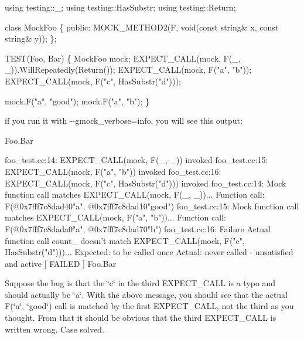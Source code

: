 \begin{DoxyCode}
\textcolor{keyword}{using} testing::\_;
\textcolor{keyword}{using} testing::HasSubstr;
\textcolor{keyword}{using} testing::Return;

\textcolor{keyword}{class }MockFoo \{
 \textcolor{keyword}{public}:
  MOCK\_METHOD2(F, \textcolor{keywordtype}{void}(\textcolor{keyword}{const} \textcolor{keywordtype}{string}& x, \textcolor{keyword}{const} \textcolor{keywordtype}{string}& y));
\};

TEST(Foo, Bar) \{
  MockFoo mock;
  EXPECT\_CALL(mock, F(\_, \_)).WillRepeatedly(Return());
  EXPECT\_CALL(mock, F(\textcolor{stringliteral}{"a"}, \textcolor{stringliteral}{"b"}));
  EXPECT\_CALL(mock, F(\textcolor{stringliteral}{"c"}, HasSubstr(\textcolor{stringliteral}{"d"})));

  mock.F(\textcolor{stringliteral}{"a"}, \textcolor{stringliteral}{"good"});
  mock.F(\textcolor{stringliteral}{"a"}, \textcolor{stringliteral}{"b"});
\}
\end{DoxyCode}


if you run it with {\ttfamily -\/-\/gmock\+\_\+verbose=info}, you will see this output\+:


\begin{DoxyCode}
[ RUN      ] Foo.Bar

foo\_test.cc:14: EXPECT\_CALL(mock, F(\_, \_)) invoked
foo\_test.cc:15: EXPECT\_CALL(mock, F("a", "b")) invoked
foo\_test.cc:16: EXPECT\_CALL(mock, F("c", HasSubstr("d"))) invoked
foo\_test.cc:14: Mock function call matches EXPECT\_CALL(mock, F(\_, \_))...
    Function call: F(@0x7fff7c8dad40"a", @0x7fff7c8dad10"good")
foo\_test.cc:15: Mock function call matches EXPECT\_CALL(mock, F("a", "b"))...
    Function call: F(@0x7fff7c8dada0"a", @0x7fff7c8dad70"b")
foo\_test.cc:16: Failure
Actual function call count_ doesn't match EXPECT\_CALL(mock, F("c", HasSubstr("d")))...
         Expected: to be called once
           Actual: never called - unsatisfied and active
[  FAILED  ] Foo.Bar
\end{DoxyCode}


Suppose the bug is that the {\ttfamily \char`\"{}c\char`\"{}} in the third {\ttfamily E\+X\+P\+E\+C\+T\+\_\+\+C\+A\+LL} is a typo and should actually be {\ttfamily \char`\"{}a\char`\"{}}. With the above message, you should see that the actual {\ttfamily F(\char`\"{}a\char`\"{}, \char`\"{}good\char`\"{})} call is matched by the first {\ttfamily E\+X\+P\+E\+C\+T\+\_\+\+C\+A\+LL}, not the third as you thought. From that it should be obvious that the third {\ttfamily E\+X\+P\+E\+C\+T\+\_\+\+C\+A\+LL} is written wrong. Case solved.

